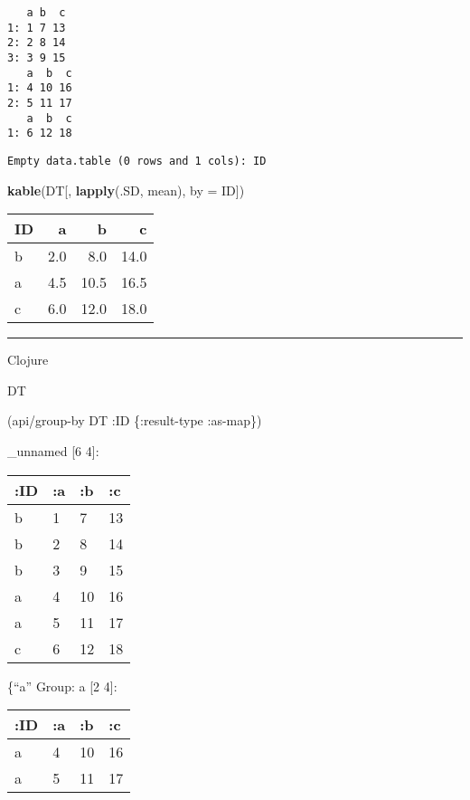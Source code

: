 \documentclass[]{article}
\newenvironment{Shaded}{\begin{snugshade}}{\end{snugshade}}
\newcommand{\KeywordTok}[1]{\textcolor[rgb]{0.13,0.29,0.53}{\textbf{#1}}}
\newcommand{\DataTypeTok}[1]{\textcolor[rgb]{0.13,0.29,0.53}{#1}}
\newcommand{\AttributeTok}[1]{\textcolor[rgb]{0.77,0.63,0.00}{#1}}
\newcommand{\NormalTok}[1]{#1}
\begin{document}
\begin{verbatim}
   a b  c
1: 1 7 13
2: 2 8 14
3: 3 9 15
   a  b  c
1: 4 10 16
2: 5 11 17
   a  b  c
1: 6 12 18
\end{verbatim}

\begin{verbatim}
Empty data.table (0 rows and 1 cols): ID
\end{verbatim}

\begin{Shaded}
\begin{Highlighting}[]
\KeywordTok{kable}\NormalTok{(DT[, }\KeywordTok{lapply}\NormalTok{(.SD, mean), }\DataTypeTok{by =}\NormalTok{ ID])}
\end{Highlighting}
\end{Shaded}

\begin{longtable}[]{@{}lrrr@{}}
\toprule
ID & a & b & c\tabularnewline
\midrule
\endhead
b & 2.0 & 8.0 & 14.0\tabularnewline
a & 4.5 & 10.5 & 16.5\tabularnewline
c & 6.0 & 12.0 & 18.0\tabularnewline
\bottomrule
\end{longtable}

\begin{center}\rule{0.5\linewidth}{0.5pt}\end{center}

Clojure

\begin{Shaded}
\begin{Highlighting}[]
\NormalTok{DT}

\NormalTok{(api/group-by DT }\AttributeTok{:ID}\NormalTok{ \{}\AttributeTok{:result-type} \AttributeTok{:as-map}\NormalTok{\})}
\end{Highlighting}
\end{Shaded}

\_unnamed {[}6 4{]}:

\begin{longtable}[]{@{}llll@{}}
\toprule
:ID & :a & :b & :c\tabularnewline
\midrule
\endhead
b & 1 & 7 & 13\tabularnewline
b & 2 & 8 & 14\tabularnewline
b & 3 & 9 & 15\tabularnewline
a & 4 & 10 & 16\tabularnewline
a & 5 & 11 & 17\tabularnewline
c & 6 & 12 & 18\tabularnewline
\bottomrule
\end{longtable}

\{``a'' Group: a {[}2 4{]}:

\begin{longtable}[]{@{}llll@{}}
\toprule
:ID & :a & :b & :c\tabularnewline
\midrule
\endhead
a & 4 & 10 & 16\tabularnewline
a & 5 & 11 & 17\tabularnewline
\bottomrule
\end{longtable}
\end{document}
